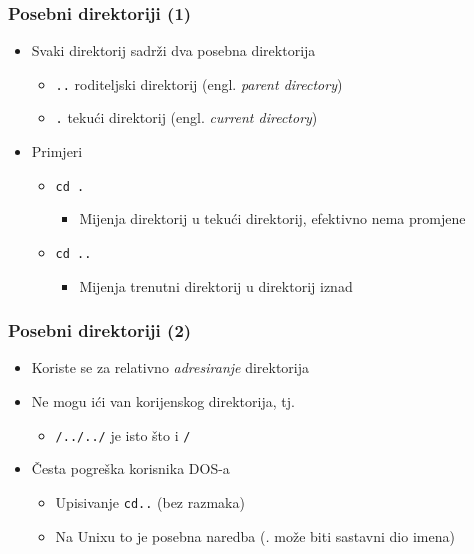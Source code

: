\documentclass{beamer}
\begin{document}
\begin{frame}[t]
\frametitle{Posebni direktoriji (1)}
\begin{itemize}
  \item Svaki direktorij sadrži dva posebna direktorija
  \begin{itemize}
    \item \texttt{..} roditeljski direktorij (engl. \emph{parent directory})
    \item \texttt{.} tekući direktorij (engl. \emph{current directory})
  \end{itemize}
  \item Primjeri
  \begin{itemize}
    \item \texttt{cd . }
    \begin{itemize}
      \item Mijenja direktorij u tekući direktorij, efektivno nema
               promjene
    \end{itemize}
    \item \texttt{cd .. }
    \begin{itemize}
      \item Mijenja trenutni direktorij u direktorij iznad
    \end{itemize}
  \end{itemize}
\end{itemize}
\end{frame}

\begin{frame}[t]
\frametitle{Posebni direktoriji (2)}
\begin{itemize}
  \item Koriste se za relativno \emph{adresiranje} direktorija
  \item Ne mogu ići van korijenskog direktorija, tj.
  \begin{itemize}
    \item[] \texttt{/../../} je isto što i \texttt{/}
  \end{itemize}
  \item Česta pogreška korisnika DOS-a
  \begin{itemize}
    \item Upisivanje \texttt{cd..} (bez razmaka)
    \item Na Unixu to je posebna naredba (\emph{.} može biti sastavni dio
          imena)
  \end{itemize}
\end{itemize}
\end{frame}
\end{document}
